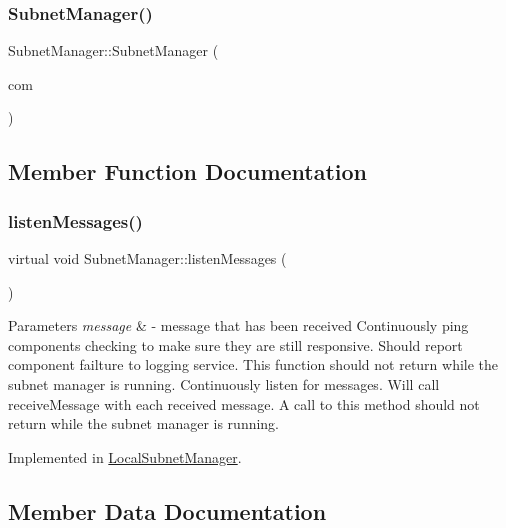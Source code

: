 \subsubsection{\texorpdfstring{Subnet\+Manager()}{SubnetManager()}}
{\footnotesize\ttfamily Subnet\+Manager\+::\+Subnet\+Manager (\begin{DoxyParamCaption}\item[{std\+::shared\+\_\+ptr$<$ \hyperlink{classSpaCommunicator}{Spa\+Communicator} $>$}]{com }\end{DoxyParamCaption})\hspace{0.3cm}{\ttfamily [inline]}}



\subsection{Member Function Documentation}
\mbox{\label{classSubnetManager_a6aed1acaa5e9f18feb7667904675d119}} 
\subsubsection{\texorpdfstring{listen\+Messages()}{listenMessages()}}
{\footnotesize\ttfamily virtual void Subnet\+Manager\+::listen\+Messages (\begin{DoxyParamCaption}{ }\end{DoxyParamCaption})\hspace{0.3cm}{\ttfamily [pure virtual]}}


\begin{DoxyParams}{Parameters}
{\em message} & -\/ message that has been received Continuously ping components checking to make sure they are still responsive. Should report component failture to logging service. This function should not return while the subnet manager is running. Continuously listen for messages. Will call receive\+Message with each received message. A call to this method should not return while the subnet manager is running. \\
\hline
\end{DoxyParams}


Implemented in \hyperlink{classLocalSubnetManager_a8cd2838196edcd75a77f532bce15c2fd}{Local\+Subnet\+Manager}.



\subsection{Member Data Documentation}
\mbox{\label{classSubnetManager_acb58a845a46fa4943cb2b9d4a56c9b0f}} 
